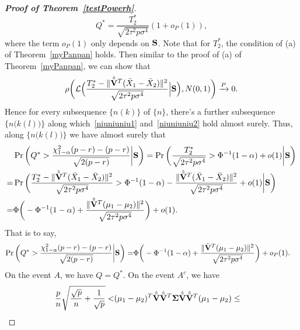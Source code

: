 \documentclass[3p]{elsarticle}
\theoremstyle{plain}
\theoremstyle{definition}
\theoremstyle{remark}
\begin{document}
\begin{appendices}
\begin{proof}[\textbf{Proof of Theorem~\ref{testPowerh}}]
    \begin{equation}\label{niuniuniu1}
    Q^*=\frac{T_2^*}{\sqrt{2\tau^2 p\sigma^4}}(1+o_P(1)),
    \end{equation}
    where the term $o_P(1)$ only depends on $\BS$.
    Note that for $T^*_2$, the condition of (a) of Theorem~\ref{myPanpan} holds. Then similar to the proof of (a) of Theorem~\ref{myPanpan}, we can show that
    \begin{equation}\label{niuniuniu2}
    \rho\bigg(\mathcal{L}\Big(
    \frac{T_2^*-\|\hat{\tilde{\mathbf{V}}}^T (\bar{X}_1-\bar{X}_2)\|^2}{\sqrt{2\tau^2 p\sigma^4}}
    \Big|\mathbf{S}\Big)
    ,N(0,1)\bigg)\xrightarrow{P}0.
    \end{equation}
    Hence for every subsequence $\{n(k)\}$ of $\{n\}$, there's a further subsequence $\big\{n\big(k(l)\big)\big\}$ along which~\eqref{niuniuniu1} and~\eqref{niuniuniu2} hold almost surely.
    Thus, along $\big\{n\big(k(l)\big)\big\}$ we have almost surely that
$$
    \begin{aligned}
        &\Pr\bigg(Q^*>\frac{\chi^2_{1-\alpha}(p-r)-(p-r)}{\sqrt{2(p-r)}}\bigg|\BS\bigg)
        =
        \Pr\bigg(\frac{T_2^*}{\sqrt{2\tau^2 p\sigma^4}}>\Phi^{-1}(1-\alpha)+o(1)\bigg|\BS\bigg)\\
        =&
        \Pr\bigg(\frac{T_2^*-\|\hat{\tilde{\BV}}^T (\bar{X}_1-\bar{X}_2)\|^2}{\sqrt{2\tau^2 p\sigma^4}}>\Phi^{-1}(1-\alpha)-\frac{\|\hat{\tilde{\BV}}^T (\bar{X}_1-\bar{X}_2)\|^2}{\sqrt{2\tau^2 p\sigma^4}}+o(1)\bigg|\BS\bigg)\\
        =&\Phi\bigg(-\Phi^{-1}(1-\alpha)+\frac{\|\hat{\tilde{\BV}}^T(\mu_1-\mu_2)\|^2}{\sqrt{2\tau^2 p\sigma^4}}\bigg)+o(1).
    \end{aligned}
$$
That is to say,
    \begin{equation}\label{niuniuniu3}
    \begin{aligned}
        \Pr\bigg(Q^*>\frac{\chi^2_{1-\alpha}(p-r)-(p-r)}{\sqrt{2(p-r)}}\bigg|\mathbf{S}\bigg)
        =&\Phi\bigg(-\Phi^{-1}(1-\alpha)+\frac{\|\tilde{\mathbf{V}}^T(\mu_1-\mu_2)\|^2}{\sqrt{2\tau^2 p\sigma^4}}\bigg)+o_P(1).
    \end{aligned}
    \end{equation}
On the event $A$, we have $Q=Q^*$.
On the event $A^c$,
we have
$$
    \begin{aligned}
            \frac{p}{n}\sqrt{\frac{\sqrt{p}}{n}+\frac{1}{\sqrt{p}}}
            <&
            (\mu_1-\mu_2)^T \hat{\tilde{\BV}}\hat{\tilde{\BV}}^T \bSigma \hat{\tilde{\BV}}\hat{\tilde{\BV}}^T(\mu_1-\mu_2)
            \leq &

\end{aligned}$$
\end{proof}
\end{appendices}
\end{document}
